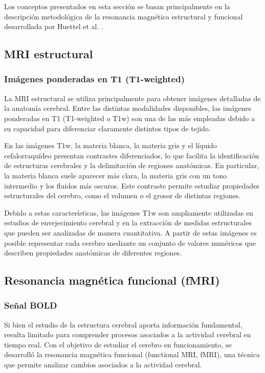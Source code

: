Los conceptos presentados en esta sección se basan principalmente en la descripción metodológica de la resonancia magnética estructural y funcional desarrollada por Huettel et al. \cite{huettel2004functional}.

\subsection{MRI estructural}
\subsubsection{Imágenes ponderadas en T1 (T1-weighted)}

La MRI estructural se utiliza principalmente para obtener imágenes detalladas de la anatomía cerebral. Entre las distintas modalidades disponibles, las imágenes ponderadas en T1 (T1-weighted o T1w) son una de las más empleadas debido a su capacidad para diferenciar claramente distintos tipos de tejido.

En las imágenes T1w, la materia blanca, la materia gris y el líquido cefalorraquídeo presentan contrastes diferenciados, lo que facilita la identificación de estructuras cerebrales y la delimitación de regiones anatómicas. En particular, la materia blanca suele aparecer más clara, la materia gris con un tono intermedio y los fluidos más oscuros. Este contraste permite estudiar propiedades estructurales del cerebro, como el volumen o el grosor de distintas regiones.

Debido a estas características, las imágenes T1w son ampliamente utilizadas en estudios de envejecimiento cerebral y en la extracción de medidas estructurales que pueden ser analizadas de manera cuantitativa. A partir de estas imágenes es posible representar cada cerebro mediante un conjunto de valores numéricos que describen propiedades anatómicas de diferentes regiones.

\subsection{Resonancia magnética funcional (fMRI)}
\subsubsection{Señal BOLD}

Si bien el estudio de la estructura cerebral aporta información fundamental, resulta limitado para comprender procesos asociados a la actividad cerebral en tiempo real. Con el objetivo de estudiar el cerebro en funcionamiento, se desarrolló la resonancia magnética funcional (functional MRI, fMRI), una técnica que permite analizar cambios asociados a la actividad cerebral.

